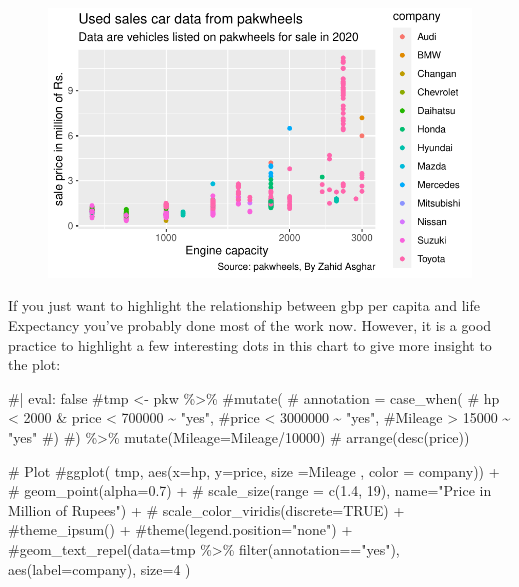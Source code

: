 \documentclass[
  letterpaper,
  DIV=11,
  numbers=noendperiod]{scrartcl}
\newenvironment{Shaded}{\begin{snugshade}}{\end{snugshade}}
\newcommand{\CommentTok}[1]{\textcolor[rgb]{0.37,0.37,0.37}{#1}}
\begin{document}
\begin{figure}[H]

{\centering \includegraphics[width=17.1875in,height=\textheight]{pakwheels_files/figure-pdf/unnamed-chunk-26-1.pdf}

}

\end{figure}

If you just want to highlight the relationship between gbp per capita
and life Expectancy you've probably done most of the work now. However,
it is a good practice to highlight a few interesting dots in this chart
to give more insight to the plot:

\begin{Shaded}
\begin{Highlighting}[]

\CommentTok{\#| eval: false}
\CommentTok{\#tmp \textless{}{-} pkw \%\textgreater{}\%}
 \CommentTok{\#mutate(}
  \CommentTok{\# annotation = case\_when(}
   \CommentTok{\# hp \textless{} 2000 \& price \textless{} 700000 \textasciitilde{} "yes",}
    \CommentTok{\#price \textless{} 3000000 \textasciitilde{} "yes",}
     \CommentTok{\#Mileage \textgreater{} 15000 \textasciitilde{} "yes"}
    \CommentTok{\#)}
\CommentTok{\#) \%\textgreater{}\% mutate(Mileage=Mileage/10000)}
 \CommentTok{\# arrange(desc(price)) }

\CommentTok{\# Plot}
\CommentTok{\#ggplot( tmp, aes(x=hp, y=price, size =Mileage , color = company)) +}
 \CommentTok{\#   geom\_point(alpha=0.7) +}
  \CommentTok{\#  scale\_size(range = c(1.4, 19), name="Price in Million of Rupees") +}
   \CommentTok{\# scale\_color\_viridis(discrete=TRUE) +}
    \CommentTok{\#theme\_ipsum() +}
    \CommentTok{\#theme(legend.position="none") +}
    \CommentTok{\#geom\_text\_repel(data=tmp \%\textgreater{}\% filter(annotation=="yes"), aes(label=company), size=4 )}
\end{Highlighting}
\end{Shaded}
\end{document}
